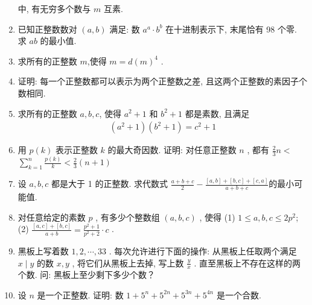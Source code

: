 \begin{enumerate}
	      中, 有无穷多个数与 $m$ 互素.
	\item 已知正整数数对 $(a, b)$ 满足: 数 $a^{a} \cdot b^{b}$ 在十进制表示下, 末尾恰有 98 个零. 求 $a b$ 的最小值.
	\item 求所有的正整数 $m$,使得 $m=d(m)^{4}$ .
	\item 证明: 每一个正整数都可以表示为两个正整数之差, 且这两个正整数的素因子个数相同.
	\item 求所有的正整数 $a ,  b ,  c$, 使得 $a^{2}+1$ 和 $b^{2}+1$ 都是素数, 且满足
	      \begin{align*}
		      \left(a^{2}+1\right)\left(b^{2}+1\right)=c^{2}+1
	      \end{align*}
	\item 用 $p(k)$ 表示正整数 $k$ 的最大奇因数. 证明: 对任意正整数 $n$ , 都有 $\frac{2}{3} n<$ $\sum_{k=1}^{n} \frac{p(k)}{k}<\frac{2}{3}(n+1)$
	\item 设 $a ,  b ,  c$ 都是大于 1 的正整数. 求代数式 $\frac{a+b+c}{2}-\frac{[a, b]+[b, c]+[c, a]}{a+b+c}$的最小可能值.
	\item 对任意给定的素数 $p$ , 有多少个整数组 $(a, b, c)$ , 使得
	      (1) $1 \leqslant a, b, c \leqslant 2 p^{2}$;
	      (2) $\frac{[a, c]+[b, c]}{a+b}=\frac{p^{2}+1}{p^{2}+2} \cdot c$ .
	\item 黑板上写着数 $1,2, \cdots, 33$ . 每次允许进行下面的操作: 从黑板上任取两个满足 $x \mid y$ 的数 $x ,  y$ , 将它们从黑板上去掉, 写上数 $\frac{y}{x}$ . 直至黑板上不存在这样的两个数. 问: 黑板上至少剩下多少个数？
	\item 设 $n$ 是一个正整数. 证明: 数 $1+5^{n}+5^{2 n}+5^{3 n}+5^{4 n}$ 是一个合数.
\end{enumerate}

